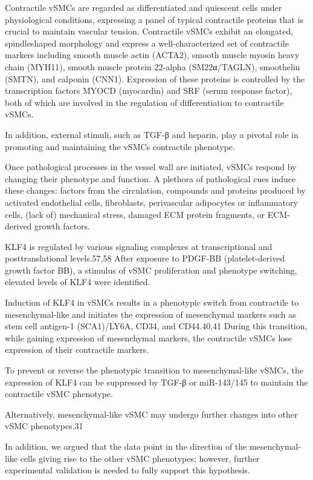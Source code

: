 Contractile vSMCs are regarded as differentiated and quiescent cells under physiological conditions, expressing a panel of typical contractile proteins that is crucial to maintain vascular tension. Contractile vSMCs exhibit an elongated, spindleshaped morphology and express a well-characterized set of contractile markers including smooth muscle actin (ACTA2), smooth muscle myosin heavy chain (MYH11), smooth muscle protein 22-alpha (SM22α/TAGLN), smoothelin (SMTN), and calponin (CNN1). Expression of these proteins is controlled by the transcription factors MYOCD (myocardin) and SRF (serum response factor), both of which are involved in the regulation of differentiation to contractile vSMCs.

In addition, external stimuli, such as TGF-β and heparin, play a pivotal role in promoting and maintaining the vSMCs contractile phenotype.

Once pathological processes in the vessel wall are initiated, vSMCs respond by changing their phenotype and function. A plethora of pathological cues induce these changes: factors from the circulation, compounds and proteins produced by activated endothelial cells, fibroblasts, perivascular adipocytes or inflammatory cells, (lack of) mechanical stress, damaged ECM protein fragments, or ECM-derived growth factors.

KLF4 is regulated by various signaling complexes at transcriptional and posttranslational levels.57,58 After exposure to PDGF-BB (platelet-derived growth factor BB), a stimulus of vSMC proliferation and phenotype switching, elevated levels of KLF4 were identified.

Induction of KLF4 in vSMCs results in a phenotypic switch from contractile to mesenchymal-like and initiates the expression of mesenchymal markers such as stem cell antigen-1 (SCA1)/LY6A, CD34, and CD44.40,41 During this transition, while gaining expression of mesenchymal markers, the contractile vSMCs lose expression of their contractile markers.
\cite{yapSixShadesVascular2021}

To prevent or reverse the phenotypic transition to mesenchymal-like vSMCs, the expression of KLF4 can be suppressed by TGF-β or miR-143/145 to maintain the contractile vSMC phenotype.

Alternatively, mesenchymal-like vSMC may undergo further changes into other vSMC phenotypes.31

In addition, we argued that the data point in the direction of the mesenchymal-like cells giving rise to the other vSMC phenotypes; however, further experimental validation is needed to fully support this hypothesis.
\cite{yapSixShadesVascular2021}

